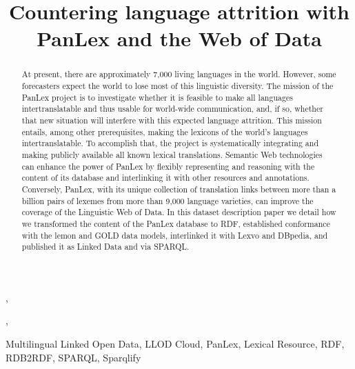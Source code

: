\documentclass[sw]{iosart2c}
\begin{document}
\begin{frontmatter} 
\title{Countering language attrition with PanLex and the Web of Data}


\author[A]{ },
\author[A]{ },
\author[B]{ }
\address[A]{University of Leipzig, \{pwestphal, cstadler\}@informatik.uni-leipzig.de}
\address[B]{The Long Now Foundation, San Francisco, pool@panlex.org}


\begin{abstract}
At present, there are approximately 7,000 living languages in the world.
However, some forecasters expect the world to lose most of this linguistic diversity.
The mission of the PanLex project is to investigate whether it is feasible to make all languages intertranslatable and thus usable for world-wide communication, and, if so, whether that new situation will interfere with this expected language attrition.
This mission entails, among other prerequisites, making the lexicons of the world's languages intertranslatable. To accomplish that, the project is systematically integrating and making publicly available all known lexical translations.
Semantic Web technologies can enhance the power of PanLex by flexibly representing and reasoning with the content of its database and interlinking it with
other resources and annotations.
Conversely, PanLex, with its unique collection of translation links between more than a billion pairs of lexemes from more than 9,000 language varieties, can improve the coverage of the Linguistic Web of Data.
In this dataset description paper we detail how we transformed the content of the PanLex database to RDF,
established conformance with the lemon and GOLD data models,
interlinked it with Lexvo and DBpedia, and published it as Linked Data and via
SPARQL.
\end{abstract}

\begin{keyword}
Multilingual Linked Open Data, LLOD Cloud, PanLex, Lexical Resource, RDF, RDB2RDF, SPARQL, Sparqlify
\end{keyword}
\end{frontmatter}
\end{document}
